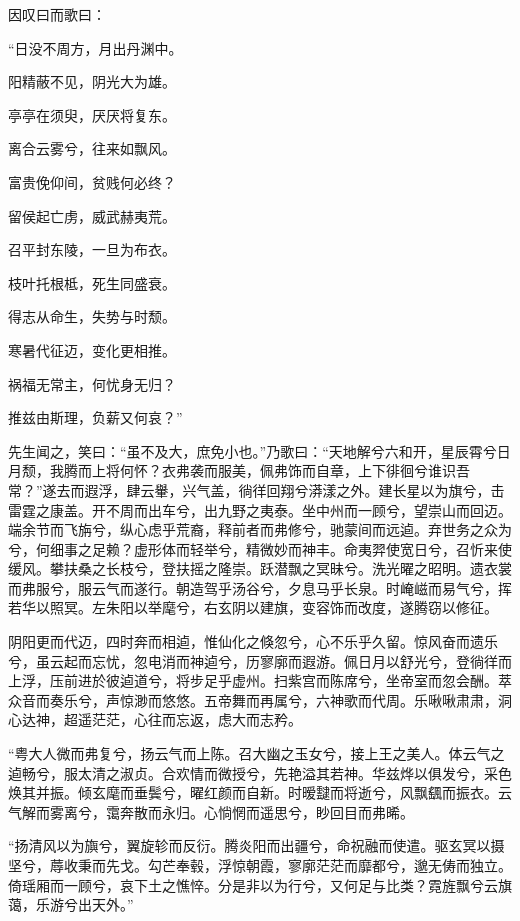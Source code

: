 \documentclass[UTF8,titlepage,oneside]{ctexbook}
\begin{document}
因叹曰而歌曰：

\begin{center}
	
	“日没不周方，月出丹渊中。
	
	
	阳精蔽不见，阴光大为雄。
	
	
	亭亭在须臾，厌厌将复东。
	
	
	离合云雾兮，往来如飘风。
	
	
	富贵俛仰间，贫贱何必终？
	
	
	留侯起亡虏，威武赫夷荒。
	
	
	召平封东陵，一旦为布衣。
	
	
	枝叶托根柢，死生同盛衰。
	
	
	得志从命生，失势与时颓。
	
	
	寒暑代征迈，变化更相推。
	
	
	祸福无常主，何忧身无归？
	
	
	推兹由斯理，负薪又何哀？”
	
\end{center}

先生闻之，笑曰：“虽不及大，庶免小也。”乃歌曰：“天地解兮六和开，星辰霄兮日月颓，我腾而上将何怀？衣弗袭而服美，佩弗饰而自章，上下徘徊兮谁识吾常？”遂去而遐浮，肆云轝，兴气盖，徜徉回翔兮漭漾之外。建长星以为旗兮，击雷霆之康盖。开不周而出车兮，出九野之夷泰。坐中州而一顾兮，望崇山而回迈。端余节而飞旃兮，纵心虑乎荒裔，释前者而弗修兮，驰蒙间而远逌。弃世务之众为兮，何细事之足赖？虚形体而轻举兮，精微妙而神丰。命夷羿使宽日兮，召忻来使缓风。攀扶桑之长枝兮，登扶摇之隆崇。跃潜飘之冥昧兮。洗光曜之昭明。遗衣裳而弗服兮，服云气而遂行。朝造驾乎汤谷兮，夕息马乎长泉。时崦嵫而易气兮，挥若华以照冥。左朱阳以举麾兮，右玄阴以建旗，变容饰而改度，遂腾窃以修征。


阴阳更而代迈，四时奔而相逌，惟仙化之倏忽兮，心不乐乎久留。惊风奋而遗乐兮，虽云起而忘忧，忽电消而神逌兮，历寥廓而遐游。佩日月以舒光兮，登徜徉而上浮，压前进於彼逌道兮，将步足乎虚州。扫紫宫而陈席兮，坐帝室而忽会酬。萃众音而奏乐兮，声惊渺而悠悠。五帝舞而再属兮，六神歌而代周。乐啾啾肃肃，洞心达神，超遥茫茫，心往而忘返，虑大而志矜。


“粤大人微而弗复兮，扬云气而上陈。召大幽之玉女兮，接上王之美人。体云气之逌畅兮，服太清之淑贞。合欢情而微授兮，先艳溢其若神。华兹烨以俱发兮，采色焕其并振。倾玄麾而垂鬓兮，曜红颜而自新。时暧靆而将逝兮，风飘颻而振衣。云气解而雾离兮，霭奔散而永归。心惝惘而遥思兮，眇回目而弗晞。


“扬清风以为旟兮，翼旋轸而反衍。腾炎阳而出疆兮，命祝融而使遣。驱玄冥以摄坚兮，蓐收秉而先戈。勾芒奉毂，浮惊朝霞，寥廓茫茫而靡都兮，邈无俦而独立。倚瑶厢而一顾兮，哀下土之憔悴。分是非以为行兮，又何足与比类？霓旌飘兮云旗蔼，乐游兮出天外。”
\end{document}
